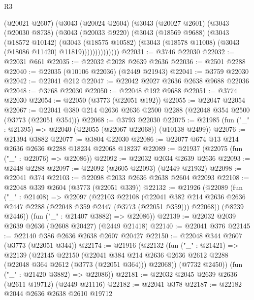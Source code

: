 \begin{lexlean}{R3}
\begin{coremodule}
              (@20021 @2607)
              (@3043
                (@20024 @2604)
                (@3043
                  (@20027 @2601)
                  (@3043
                    (@20030 @8738)
                    (@3043
                      (@20033 @9220)
                      (@3043
                        (@18569 @9688)
                        (@3043
                          (@18572 @10142)
                          (@3043
                            (@18575 @10582)
                            (@3043 (@18578 @11008) (@3043 (@18086 @11420) @11819))))))))))))))
@22031 := @3746 @22030
@22032 := @22031 @661
@22035 := @22032 @2028 @2639 @2636
@22036 := @2501 @2288
@22040 := @22035 (@10106 @22036) (@2449 @21943)
@22041 := @3759 @22030
@22042 := @22041 @212
@22047 := @22042 @2027 @2636 @2638 @9688 @22036
@22048 := @3768 @22030
@22050 := @22048 @192 @9688
@22051 := @3774 @22030
@22054 := @22050 (@3773 (@22051 @192))
@22055 := @22047 @22054
@22067 := @22041 @380 @214 @2636 @2636 @2500 @2288 (@22048 @354 @2500 (@3773 (@22051 @354)))
@22068 := @3793 @22030
@22075 := @21985 (fun ("_" : @21395) => @22040 (@22055 (@22067 @22068)) (@10138 @2499))
@22076 := @21394 @3882
@22077 := @3804 @22030
@22086 := @22077 @674 @13 @214 @2636 @2636 @2288 @18234 @22068 @18237
@22089 := @21937 (@22075 (fun ("_" : @22076) => @22086))
@22092 := @22032 @2034 @2639 @2636
@22093 := @2448 @2288
@22097 := @22092 (@2605 @22093) (@2449 @21932)
@22098 := @22041 @374
@22103 := @22098 @2033 @2636 @2638 @2604 @22093
@22108 := @22048 @339 @2604 (@3773 (@22051 @339))
@22132 := @21926
    (@22089
      (fun ("_" : @21408) =>
      @22097
        (@22103
          @22108
          (@22041
            @382
            @214
            @2636
            @2636
            @2447
            @2288
            (@22048 @359 @2447 (@3773 (@22051 @359)))
            @22068))
        (@8239 @2446))
      (fun ("_" : @21407 @3882) => @22086))
@22139 := @22032 @2039 @2639 @2636 (@2608 @20427) (@2449 @21418)
@22140 := @22041 @376
@22145 := @22140 @386 @2636 @2638 @2607 @20427
@22150 := @22048 @344 @2607 (@3773 (@22051 @344))
@22174 := @21916
    (@22132
      (fun ("_" : @21421) =>
      @22139
        (@22145
          @22150
          (@22041
            @384
            @214
            @2636
            @2636
            @2612
            @2288
            (@22048 @364 @2612 (@3773 (@22051 @364)))
            @22068))
        (@7732 @2450))
      (fun ("_" : @21420 @3882) => @22086))
@22181 := @22032 @2045 @2639 @2636 (@2611 @19712) (@2449 @21116)
@22182 := @22041 @378
@22187 := @22182 @2044 @2636 @2638 @2610 @19712

\end{coremodule}
\end{lexlean}
